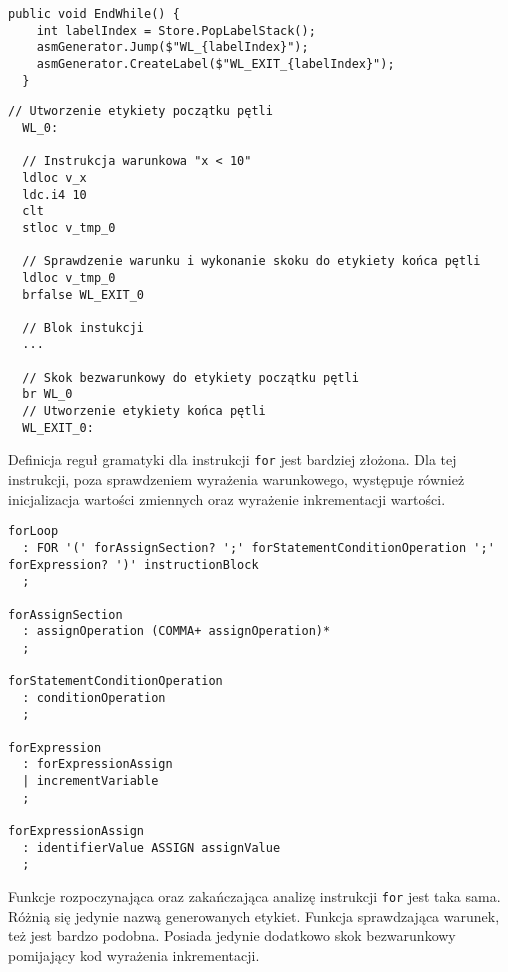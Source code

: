 \begin{lstlisting}[language=CSharp, caption={Implementacja funkcji obsługująca kończącej analize instrukcji \texttt{while}}, label=alg:while4]
  public void EndWhile() {
    int labelIndex = Store.PopLabelStack();
    asmGenerator.Jump($"WL_{labelIndex}");
    asmGenerator.CreateLabel($"WL_EXIT_{labelIndex}");
  }
\end{lstlisting}

\begin{lstlisting}[language=IL, caption={Kod assemblera przedstawiający konstrukcję \texttt{while}}, label=alg:while5]
  // Utworzenie etykiety początku pętli 
  WL_0: 
  
  // Instrukcja warunkowa "x < 10"
  ldloc v_x
  ldc.i4 10
  clt
  stloc v_tmp_0
  
  // Sprawdzenie warunku i wykonanie skoku do etykiety końca pętli
  ldloc v_tmp_0
  brfalse WL_EXIT_0
  
  // Blok instukcji
  ...

  // Skok bezwarunkowy do etykiety początku pętli 
  br WL_0
  // Utworzenie etykiety końca pętli 
  WL_EXIT_0: 
\end{lstlisting}

\par Definicja reguł gramatyki dla instrukcji \texttt{for} jest bardziej złożona. Dla tej instrukcji, poza sprawdzeniem wyrażenia warunkowego, występuje również inicjalizacja wartości zmiennych oraz wyrażenie inkrementacji wartości.

\begin{lstlisting}[language=IL, caption={Gramatyka dla instrukcji \texttt{while}}, label=alg:for1]
forLoop
  : FOR '(' forAssignSection? ';' forStatementConditionOperation ';' forExpression? ')' instructionBlock
  ;

forAssignSection
  : assignOperation (COMMA+ assignOperation)*
  ;

forStatementConditionOperation
  : conditionOperation
  ;

forExpression
  : forExpressionAssign
  | incrementVariable
  ;

forExpressionAssign
  : identifierValue ASSIGN assignValue
  ;
\end{lstlisting}

\par Funkcje rozpoczynająca oraz zakańczająca analizę instrukcji \texttt{for} jest taka sama. Różnią się jedynie nazwą generowanych etykiet. Funkcja sprawdzająca warunek, też jest bardzo podobna. Posiada jedynie dodatkowo skok bezwarunkowy pomijający kod wyrażenia inkrementacji.

